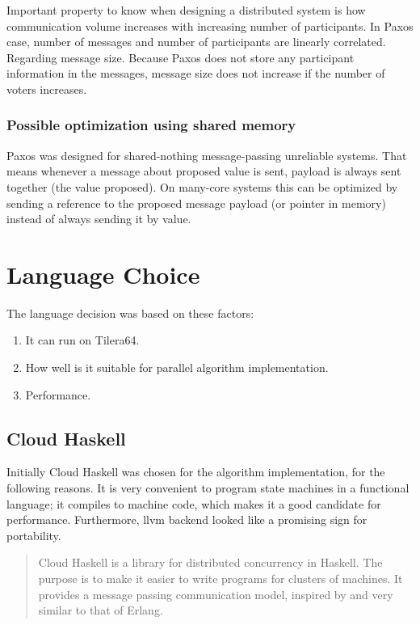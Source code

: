 \documentclass[english,11pt]{l4proj}
\begin{document}
Important property to know when designing a distributed system is how
communication volume increases with increasing number of participants. In Paxos
case, number of messages and number of participants are linearly correlated.
Regarding message size. Because Paxos does not store any participant information
in the messages, message size does not increase if the number of voters
increases.

\subsubsection{Possible optimization using shared memory}

Paxos was designed for shared-nothing message-passing unreliable systems. That
means whenever a message about proposed value is sent, payload is always sent
together (the value proposed). On many-core systems this can be optimized by
sending a reference to the proposed message payload (or pointer in memory)
instead of always sending it by value.

\section{Language Choice}
\label{sec:erlang-why}

The language decision was based on these factors:
\begin{enumerate}
    \item It can run on Tilera64.
    \item How well is it suitable for parallel algorithm implementation.
    \item Performance.
\end{enumerate}

\subsection{Cloud Haskell}

Initially Cloud Haskell\cite{cloud-haskell}  was chosen for the algorithm
implementation, for the following reasons. It is very convenient to program
state machines in a functional language; it compiles to machine code, which
makes it a good candidate for performance. Furthermore, llvm
backend\cite{llvm-haskell} looked like a promising sign for portability.

\begin{quote}
    Cloud Haskell is a library for distributed concurrency in Haskell. The
    purpose is to make it easier to write programs for clusters of machines. It
    provides a message passing communication model, inspired by and very similar
    to that of Erlang.
\end{quote}
\end{document}
